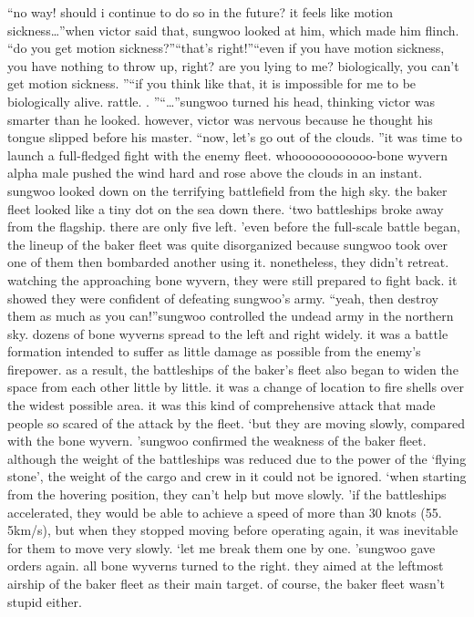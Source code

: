 “no way! should i continue to do so in the future? it feels like motion sickness…”when victor said that, sungwoo looked at him, which made him flinch.
“do you get motion sickness?”“that’s right!”“even if you have motion sickness, you have nothing to throw up, right? are you lying to me? biologically, you can’t get motion sickness.
”“if you think like that, it is impossible for me to be biologically alive.
 rattle.
.
”“…”sungwoo turned his head, thinking victor was smarter than he looked.
however, victor was nervous because he thought his tongue slipped before his master.
“now, let’s go out of the clouds.
”it was time to launch a full-fledged fight with the enemy fleet.
whoooooooooooo-bone wyvern alpha male pushed the wind hard and rose above the clouds in an instant.
sungwoo looked down on the terrifying battlefield from the high sky.
 the baker fleet looked like a tiny dot on the sea down there.
‘two battleships broke away from the flagship.
 there are only five left.
’even before the full-scale battle began, the lineup of the baker fleet was quite disorganized because sungwoo took over one of them then bombarded another using it.
nonetheless, they didn’t retreat.
 watching the approaching bone wyvern, they were still prepared to fight back.
 it showed they were confident of defeating sungwoo’s army.
“yeah, then destroy them as much as you can!”sungwoo controlled the undead army in the northern sky.
 dozens of bone wyverns spread to the left and right widely.
 it was a battle formation intended to suffer as little damage as possible from the enemy’s firepower.
as a result, the battleships of the baker’s fleet also began to widen the space from each other little by little.
 it was a change of location to fire shells over the widest possible area.
 it was this kind of comprehensive attack that made people so scared of the attack by the fleet.
‘but they are moving slowly, compared with the bone wyvern.
’sungwoo confirmed the weakness of the baker fleet.
 although the weight of the battleships was reduced due to the power of the ‘flying stone’, the weight of the cargo and crew in it could not be ignored.
‘when starting from the hovering position, they can’t help but move slowly.
’if the battleships accelerated, they would be able to achieve a speed of more than 30 knots (55.
5km/s), but when they stopped moving before operating again, it was inevitable for them to move very slowly.
‘let me break them one by one.
’sungwoo gave orders again.
 all bone wyverns turned to the right.
 they aimed at the leftmost airship of the baker fleet as their main target.
of course, the baker fleet wasn’t stupid either.
